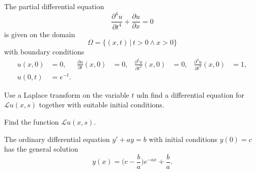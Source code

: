 The partial differential equation
\begin{equation}
\frac{\partial^4 u}{\partial t^4}
+
\frac{\partial u}{\partial x}
=
0
\label{50000013:dgl}
\end{equation}
is given on the domain
\[
\Omega = \{ (x,t)\,|\, t>0\wedge x > 0\}
\]
with boundary conditions
\begin{equation}
\begin{aligned}
u(x,0)&=0,
&
\frac{\partial u}{\partial t}(x,0)
&=
0,
&
\frac{\partial^2 u}{\partial t^2}(x,0)
&=
0,
&
\frac{\partial^3 u}{\partial t^3}(x,0)
&=1,
\\
u(0,t)&=e^{-t}.
\end{aligned}
\end{equation}
\begin{teilaufgaben}
\item
Use a Laplace transform on the variable $t$ udn find a differential
equation for
$\mathcal{L}u(x,s)$ together with suitable initial conditions.
\item
Find the function $\mathcal{L}u(x,s)$.
\end{teilaufgaben}

\begin{hinweis}
The ordinary differential equation $y'+ay=b$ with initial conditions
$y(0)=c$ has the general solution
\[
y(x) = \biggl(c-\frac{b}{a}\biggr)e^{-ax} + \frac{b}{a}.
\]
\end{hinweis}

